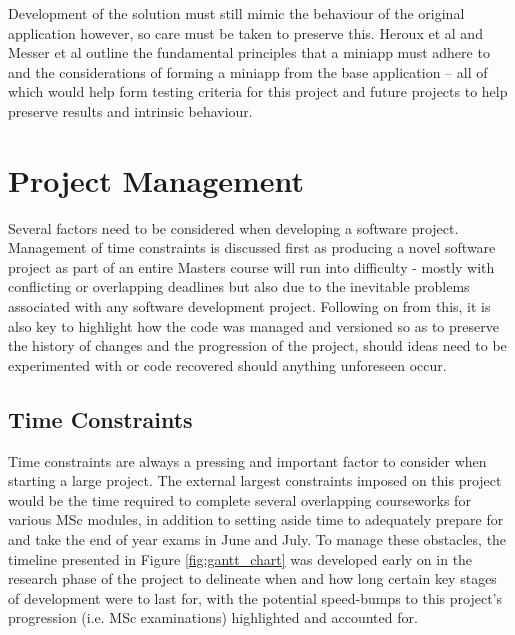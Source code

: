 \documentclass[conference]{IEEEtran}
\begin{document}
Development of the solution must still mimic the behaviour of the original application however, so care must be taken to preserve this. Heroux et al\cite{miniapps} and Messer et al\cite{messer2015developing} outline the fundamental principles that a miniapp must adhere to and the considerations of forming a miniapp from the base application – all of which would help form testing criteria for this project and future projects to help preserve results and intrinsic behaviour.


\section{Project Management}\label{projectmgmt}

Several factors need to be considered when developing a software project. Management of time constraints is discussed first as producing a novel software project as part of an entire Masters course will run into difficulty - mostly with conflicting or overlapping deadlines but also due to the inevitable problems associated with any software development project. Following on from this, it is also key to highlight how the code was managed and versioned so as to preserve the history of changes and the progression of the project, should ideas need to be experimented with or code recovered should anything unforeseen occur.

\subsection{Time Constraints}

Time constraints are always a pressing and important factor to consider when starting a large project. The external largest constraints imposed on this project would be the time required to complete several overlapping courseworks for various MSc modules, in addition to setting aside time to adequately prepare for and take the end of year exams in June and July. To manage these obstacles, the timeline presented in Figure \ref{fig:gantt_chart} was developed early on in the research phase of the project to delineate when and how long certain key stages of development were to last for, with the potential speed-bumps to this project's progression (i.e. MSc examinations) highlighted and accounted for.
\end{document}
